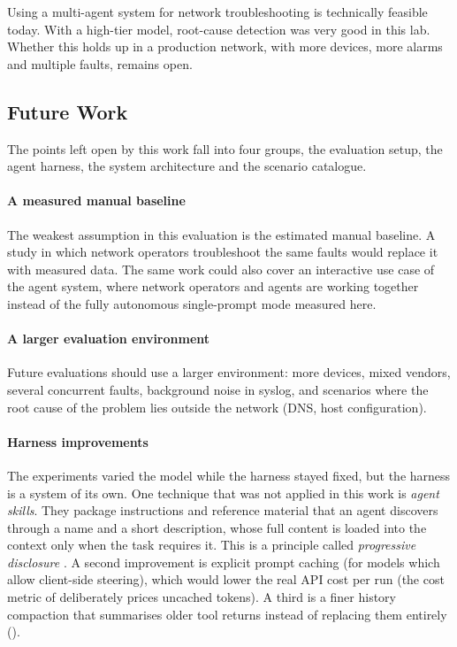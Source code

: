 Using a multi-agent system for network troubleshooting is technically feasible today. With a
high-tier model, root-cause detection was very good in this lab. Whether this holds up in a
production network, with more devices, more alarms and multiple faults, remains open.

\newpage
\subsection{Future Work}
\label{sec:future-work}

The points left open by this work fall into four groups, the evaluation setup, the agent
harness, the system architecture and the scenario catalogue.

\paragraph{A measured manual baseline} The weakest assumption in this evaluation is the estimated manual baseline. A study in which
network operators troubleshoot the same faults would replace it with measured
data. The same work could also cover an interactive use case of the agent system, where network operators and agents are working
together instead of the fully autonomous single-prompt mode measured here.

\paragraph{A larger evaluation environment} Future evaluations
should use a larger environment: more devices, mixed vendors, several concurrent faults,
background noise in syslog, and scenarios where the root cause of the problem lies outside the network (DNS, host
configuration).

\paragraph{Harness improvements} The experiments varied the model while the harness
stayed fixed, but the harness is a system of its own. One technique that was not applied in this
work is \emph{agent skills}. They package instructions and reference material that an agent
discovers through a name and a short description, whose full content is loaded into the
context only when the task requires it. This is a principle called \emph{progressive
disclosure} \parencite{anthropic_agent_skills}. A second improvement is explicit prompt caching (for models which allow client-side steering), which would
lower the real API cost per run (the cost metric of  deliberately prices
uncached tokens). A third is a finer history compaction that summarises older tool returns instead of
replacing them entirely ().

